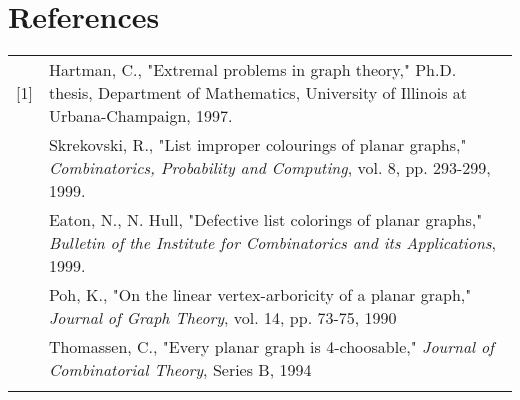 \documentclass[11pt,letter]{article}
\begin{document}
\section*{References}

\begin{tabularx}{\linewidth}{lX}
[1] & Hartman, C., "Extremal problems in graph theory," Ph.D. thesis, Department of Mathematics,
University of Illinois at Urbana-Champaign, 1997.\\\relax
[2] & Skrekovski, R., "List improper colourings of planar graphs,"
\emph{Combinatorics, Probability and Computing}, vol. 8, pp. 293-299, 1999.\\\relax
[3] & Eaton, N., N. Hull, "Defective list colorings of planar graphs,"
\emph{Bulletin of the Institute for Combinatorics and its Applications}, 1999.\\\relax
[4] & Poh, K., "On the linear vertex-arboricity of a planar graph," \emph{Journal of Graph Theory},
vol. 14, pp. 73-75, 1990\\\relax
[5] & Thomassen, C., "Every planar graph is 4-choosable," \emph{Journal of Combinatorial Theory},
Series B, 1994\\\relax

\end{tabularx}
\end{document}
